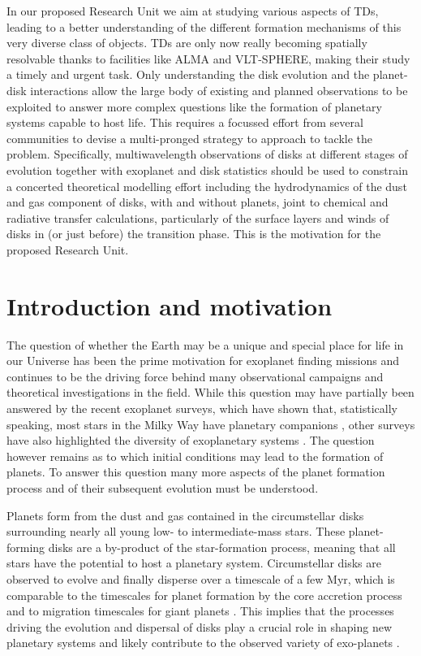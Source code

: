 \documentclass[10pt,fleqn,twoside]{article}
\begin{document}
In our proposed Research Unit we aim at studying various aspects of
TDs, leading to a better understanding of the different formation
mechanisms of this very diverse class of objects. TDs are
only now really becoming spatially resolvable thanks
to facilities like ALMA and VLT-SPHERE, making their study a timely and
urgent task. Only understanding the disk evolution and the planet-disk
interactions allow the large body of existing and planned observations to be
exploited to answer more complex questions like the formation of planetary
systems capable to host life. This requires a focussed effort from
several communities to devise a multi-pronged strategy to approach to
tackle the problem. Specifically, multiwavelength observations of disks at
different stages of evolution together with exoplanet and disk statistics
should be used to constrain a concerted theoretical modelling effort
including the hydrodynamics of the dust and gas component of disks, with and
without planets, joint to chemical and radiative transfer calculations,
particularly of the surface layers and winds of disks in (or just
before) the transition phase. This is the motivation for the proposed Research Unit.


\section{Introduction and motivation}

The question of whether the Earth may be a unique and special place for life
in our Universe has been the prime motivation for exoplanet finding missions
and continues to be the driving force behind many observational campaigns and
theoretical investigations in the field. While this question may have
partially been answered by the recent exoplanet surveys, which have shown
 that, statistically speaking, most stars in the Milky Way have planetary
  companions \citep{2012Natur.481..167C}, other surveys have
also highlighted the diversity of exoplanetary systems \citep{2015ApJS..217...31M}. 
The question however remains as to which
initial conditions may lead to the formation of planets. To answer
this question many more aspects of the planet formation process and of their
subsequent evolution must be understood.

Planets form from the dust and gas contained in the circumstellar disks surrounding nearly all young low- to intermediate-mass stars. These planet-forming disks are a by-product of the star-formation process, meaning that all stars have the potential to host a planetary system.
Circumstellar disks are observed to evolve and finally disperse over a
timescale of a few Myr, which is comparable to
the timescales for planet formation by the core accretion process
 and to migration timescales for giant planets
\citep[see][for a review]{2011ARA&A..49..195A}. This implies that the processes driving the
evolution and dispersal of disks play a crucial role in shaping new
planetary systems and likely contribute to the observed variety of exo-planets
\citep[see e.g.,]{2012MNRAS.422L..82A, 2015MNRAS.450.3008E}.
\end{document}
